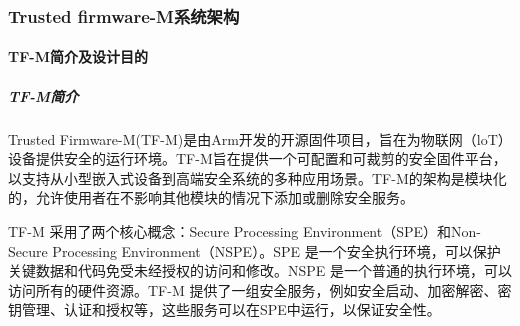 \documentclass[12pt,a4paper]{ctexart}
\numberwithin{figure}{section}
\begin{document}

\subsubsection{Trusted firmware-M系统架构}
\paragraph{TF-M简介及设计目的}
\subparagraph{TF-M简介}
\par Trusted Firmware-M(TF-M)是由Arm开发的开源固件项目，旨在为物联网（loT）设备提供安全的运行环境。TF-M旨在提供一个可配置和可裁剪的安全固件平台，以支持从小型嵌入式设备到高端安全系统的多种应用场景。TF-M的架构是模块化的，允许使用者在不影响其他模块的情况下添加或删除安全服务。
\par TF-M 采用了两个核心概念：Secure Processing Environment（SPE）和Non-Secure Processing Environment（NSPE）。SPE 是一个安全执行环境，可以保护关键数据和代码免受未经授权的访问和修改。NSPE 是一个普通的执行环境，可以访问所有的硬件资源。TF-M 提供了一组安全服务，例如安全启动、加密解密、密钥管理、认证和授权等，这些服务可以在SPE中运行，以保证安全性。
\end{document}
